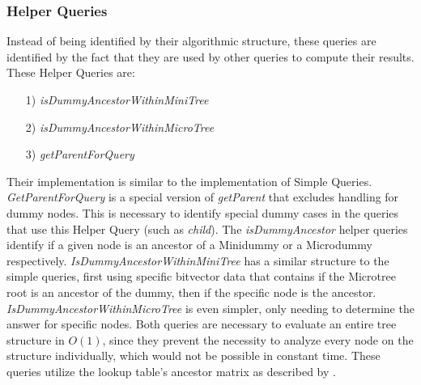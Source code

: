\documentclass{article}
\begin{document}
\subsubsection{Helper Queries} \label{Helper Queries}
Instead of being identified by their algorithmic structure, these queries are identified by the fact that they are used by other queries to compute their results.\\
These Helper Queries are:
\begin{itemize}
	\item[1)] \textit{isDummyAncestorWithinMiniTree}
	\item[2)] \textit{isDummyAncestorWithinMicroTree}
	\item[3)] \textit{getParentForQuery}
\end{itemize}
Their implementation is similar to the implementation of Simple Queries.\\
\textit{GetParentForQuery} is a special version of \textit{getParent} that excludes handling for dummy nodes. This is necessary to identify special dummy cases in the queries that use this Helper Query (such as \textit{child}).
The \textit{isDummyAncestor} helper queries identify if a given node is an ancestor of a Minidummy or a Microdummy respectively. \textit{IsDummyAncestorWithinMiniTree} has a similar structure to the simple queries, first using specific bitvector data that contains if the Microtree root is an ancestor of the dummy, then if the specific node is the ancestor. \textit{IsDummyAncestorWithinMicroTree} is even simpler, only needing to determine the answer for specific nodes. Both queries are necessary to evaluate an entire tree structure in $O(1)$, since they prevent the necessity to analyze every node on the structure individually, which would not be possible in constant time. These queries utilize the lookup table's ancestor matrix as described by \cite{farzanMunro}.
\end{document}

